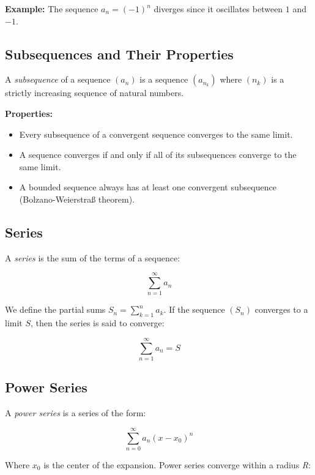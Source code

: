 \textbf{Example:}
\vspace{\baselineskip}
The sequence \(a_n = {(-1)}^n\) diverges since it oscillates between \(1\) and \(-1\).

\subsection{Subsequences and Their Properties}

A \emph{subsequence} of a sequence \((a_n)\) is a sequence \((a_{n_k})\) where \((n_k)\) is a strictly 
increasing sequence of natural numbers.

\textbf{Properties:}

\begin{itemize}

    \item Every subsequence of a convergent sequence converges to the same limit.

    \item A sequence converges if and only if all of its subsequences converge to the same limit.

    \item A bounded sequence always has at least one convergent subsequence (Bolzano-Weierstraß theorem).

\end{itemize}

\subsection{Series}

A \emph{series} is the sum of the terms of a sequence:

\[
    \sum_{n=1}^{\infty} a_n
\]

We define the partial sums \(S_n = \sum_{k=1}^n a_k\). If the sequence \((S_n)\) converges to a limit \(S\), then the series is said to converge:

\[
    \sum_{n=1}^{\infty} a_n = S
\]

\subsection{Power Series}

A \emph{power series} is a series of the form:

\[
    \sum_{n=0}^{\infty} a_n {(x - x_0)}^n
\]

Where \(x_0\) is the center of the expansion. Power series converge within a radius \emph{R}:

